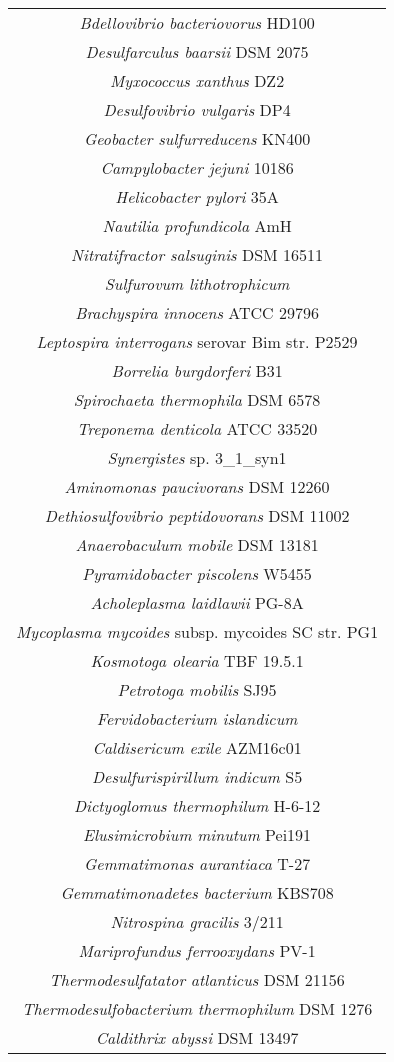 \begin{table}
\begin{tabular}{|c|}
\textit{Bdellovibrio bacteriovorus} HD100\\
\textit{Desulfarculus baarsii} DSM 2075\\
\textit{Myxococcus xanthus} DZ2\\
\textit{Desulfovibrio vulgaris} DP4\\
\textit{Geobacter sulfurreducens} KN400\\
\textit{Campylobacter jejuni} 10186\\
\textit{Helicobacter pylori} 35A\\
\textit{Nautilia profundicola} AmH\\
\textit{Nitratifractor salsuginis} DSM 16511\\
\textit{Sulfurovum lithotrophicum}\\
\textit{Brachyspira innocens} ATCC 29796\\
\textit{Leptospira interrogans} serovar Bim str. P2529\\
\textit{Borrelia burgdorferi} B31\\
\textit{Spirochaeta thermophila} DSM 6578\\
\textit{Treponema denticola} ATCC 33520\\
\textit{Synergistes} sp. 3\_1\_syn1\\
\textit{Aminomonas paucivorans} DSM 12260\\
\textit{Dethiosulfovibrio peptidovorans} DSM 11002\\
\textit{Anaerobaculum mobile} DSM 13181\\
\textit{Pyramidobacter piscolens} W5455\\
\textit{Acholeplasma laidlawii} PG-8A\\
\textit{Mycoplasma mycoides} subsp. mycoides SC str. PG1\\
\textit{Kosmotoga olearia} TBF 19.5.1\\
\textit{Petrotoga mobilis} SJ95\\
\textit{Fervidobacterium islandicum}\\
\textit{Caldisericum exile} AZM16c01\\
\textit{Desulfurispirillum indicum} S5\\
\textit{Dictyoglomus thermophilum} H-6-12\\
\textit{Elusimicrobium minutum} Pei191\\
\textit{Gemmatimonas aurantiaca} T-27\\
\textit{Gemmatimonadetes bacterium} KBS708\\
\textit{Nitrospina gracilis} 3/211\\
\textit{Mariprofundus ferrooxydans} PV-1\\
\textit{Thermodesulfatator atlanticus} DSM 21156\\
\textit{Thermodesulfobacterium thermophilum} DSM 1276\\
\textit{Caldithrix abyssi} DSM 13497\\
\hline
\end{tabular}
\caption[]{}
\label{tab:edicer_genome_bacteria}
\end{table}


